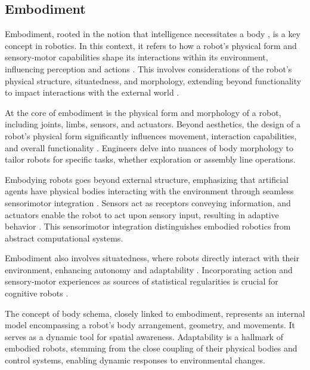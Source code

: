 \subsection{Embodiment}
Embodiment, rooted in the notion that intelligence necessitates a body \cite{Pfeifer2006Howbodyshapes}, is a key concept in robotics. In this context, it refers to how a robot's physical form and sensory-motor capabilities shape its interactions within its environment, influencing perception and actions \cite{Duffy2000Intelligentrobotsquestion}. This involves considerations of the robot's physical structure, situatedness, and morphology, extending beyond functionality to impact interactions with the external world \cite{Miller2018EmbodimentSituatednessMorphology}.

At the core of embodiment is the physical form and morphology of a robot, including joints, limbs, sensors, and actuators. Beyond aesthetics, the design of a robot's physical form significantly influences movement, interaction capabilities, and overall functionality \cite{Pfeifer2006MorphologicalComputationConnecting}. Engineers delve into nuances of body morphology to tailor robots for specific tasks, whether exploration or assembly line operations.

Embodying robots goes beyond external structure, emphasizing that artificial agents have physical bodies interacting with the environment through seamless sensorimotor integration \cite{Lara2018EmbodiedCognitiveRobotics}. Sensors act as receptors conveying information, and actuators enable the robot to act upon sensory input, resulting in adaptive behavior \cite{Pfeifer2007SelfOrganizationEmbodiment,Der2014RoleEmbodimentSelf}. This sensorimotor integration distinguishes embodied robotics from abstract computational systems.

Embodiment also involves situatedness, where robots directly interact with their environment, enhancing autonomy and adaptability \cite{Brooks1991NewApproachesRobotics}. Incorporating action and sensory-motor experiences as sources of statistical regularities is crucial for cognitive robots \cite{Pezzulo2013ComputationalGroundedCognition}.

The concept of body schema, closely linked to embodiment, represents an internal model encompassing a robot's body arrangement, geometry, and movements. It serves as a dynamic tool for spatial awareness. Adaptability is a hallmark of embodied robots, stemming from the close coupling of their physical bodies and control systems, enabling dynamic responses to environmental changes.

